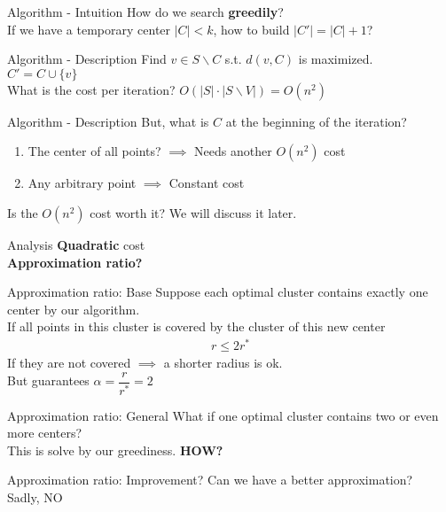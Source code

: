 \documentclass{beamer}
\newcommand*{\brk}{\\[10pt]}
\begin{document}
\begin{frame}{Algorithm - Intuition}
    How do we search \textbf{greedily}? \\[10pt]
    If we have a temporary center $|C| < k$, how to build $|C'| = |C| + 1$?
\end{frame}


\begin{frame}{Algorithm - Description}
    Find $v \in S \backslash C$ s.t. $d(v, C)$ is maximized. \brk
    $C' = C \cup \{v\}$ \brk
    \pause
    What is the cost per iteration? \pause $O(|S| \cdot |S \backslash V|) = O(n^2)$
\end{frame}

\begin{frame}{Algorithm - Description}
    But, what is $C$ at the beginning of the iteration? 
    \pause 
    \begin{enumerate}
        \item The center of all points? $\implies$ Needs another $O(n^2)$ cost 
        \item Any arbitrary point $\implies$ Constant cost
    \end{enumerate}
    \pause
    Is the $O(n^2)$ cost worth it? We will discuss it later.
\end{frame}

\begin{frame}{Analysis}
    \textbf{Quadratic} cost
    \pause\brk
    \textbf{Approximation ratio?}
\end{frame}

\begin{frame}{Approximation ratio: Base}
    Suppose each optimal cluster contains exactly one center by our algorithm.\brk
    \pause
    If all points in this cluster is covered by the cluster of this new center
    \begin{align*}
        r \leq 2r^*        
    \end{align*}
    If they are not covered $\implies$ a shorter radius is ok. \brk
    \pause 
    But guarantees $\alpha = \dfrac{r}{r^*} = 2$ 
\end{frame}

\begin{frame}{Approximation ratio: General}
    What if one optimal cluster contains two or even more centers? \brk 
    This is solve by our greediness. \textbf{HOW?}
\end{frame}

\begin{frame}{Approximation ratio: Improvement?}
    Can we have a better approximation? \brk
    Sadly, NO
\end{frame}
\end{document}
